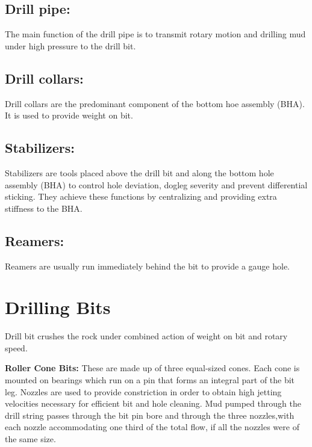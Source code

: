 \vspace{1em}

\subsection*{\textbf{Drill pipe:}} The main function of the drill pipe is to transmit rotary motion and
drilling mud under high pressure to the drill bit.

\vspace{1em}

\subsection*{\textbf{Drill collars:}} Drill collars are the predominant component of the bottom hoe assembly (BHA). 
It is used to provide weight on bit.

\vspace{1em}

\subsection*{\textbf{Stabilizers:}} Stabilizers are tools placed above the drill bit and along the bottom hole assembly (BHA)
to control hole deviation, dogleg severity and prevent differential sticking. 
They achieve these functions by centralizing and providing extra stiffness to the BHA.

\vspace{1em}


\subsection*{\textbf{Reamers:}} Reamers are usually run immediately behind the bit to provide a gauge hole.


\section{Drilling Bits}

Drill bit crushes the rock under combined action of weight on bit and rotary speed.

\vspace{1em}

\textbf{Roller Cone Bits:} These are made up of three equal-sized cones. Each cone is 
mounted on bearings which run on a pin that forms an integral part of the bit leg.
Nozzles are used to provide constriction in order to obtain high jetting velocities 
necessary for efficient bit and hole cleaning. Mud pumped through the drill string passes 
through the bit pin bore and through the three nozzles,with each nozzle accommodating 
one third of the total flow, if all the nozzles were of the same size.

